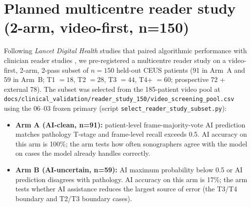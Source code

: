 \documentclass[11pt,a4paper]{article}
\begin{document}
\section{Planned multicentre reader study (2-arm, video-first, n=150)}
\label{app:reader}
Following \emph{Lancet Digital Health} studies that paired algorithmic performance with clinician reader studies \cite{gao2022ovarian, jiang2021stroma, sounderajah2022aipath}, we pre-registered a multicentre reader study on a video-first, 2-arm, 2-pass subset of $n=150$ held-out CEUS patients (91 in Arm~A and 59 in Arm~B; T1 $=18$, T2 $=28$, T3 $=44$, T4+ $=60$; prospective 72 + external 78). The subset was selected from the 185-patient video pool at \texttt{docs/clinical\_validation/reader\_study\_150/video\_screening\_pool.csv} using the 06--03 frozen primary (script \texttt{select\_reader\_study\_subset.py}):

\begin{itemize}[leftmargin=*,itemsep=2pt]
  \item \textbf{Arm A (AI-clean, n=91):} patient-level frame-majority-vote AI prediction matches pathology T-stage and frame-level recall exceeds 0.5. AI accuracy on this arm is 100\%; the arm tests how often sonographers agree with the model on cases the model already handles correctly.
  \item \textbf{Arm B (AI-uncertain, n=59):} AI maximum probability below 0.5 or AI prediction disagrees with pathology. AI accuracy on this arm is 17\%; the arm tests whether AI assistance reduces the largest source of error (the T3/T4 boundary and T2/T3 boundary cases).
\end{itemize}
\end{document}
